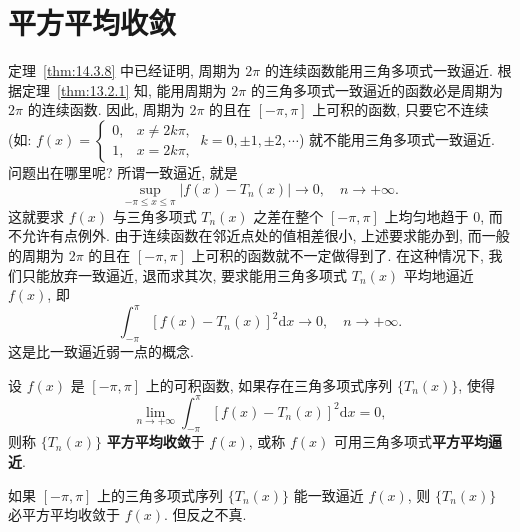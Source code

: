 \section{平方平均收敛}\label{sec:16.2}

定理~\ref{thm:14.3.8} 中已经证明, 周期为 $2\pi$ 的连续函数能用三角多项式一致逼近. 根据定理~\ref{thm:13.2.1} 知, 能用周期为 $2\pi$ 的三角多项式一致逼近的函数必是周期为 $2\pi$ 的连续函数. 因此, 周期为 $2\pi$ 的且在 $[-\pi, \pi]$ 上可积的函数, 只要它不连续(如: $f(x) = \begin{cases} 0, & x \neq 2k\pi, \\ 1, & x = 2k\pi, \end{cases}\ k = 0, \pm 1, \pm 2, \cdots$) 就不能用三角多项式一致逼近. 问题出在哪里呢? 所谓一致逼近, 就是
\[
  \sup_{-\pi\leqslant x\leqslant\pi}\left|f(x)-T_{n}(x)\right|\to0,\quad n\to+\infty.
\]
这就要求 $f(x)$ 与三角多项式 $T_{n}(x)$ 之差在整个 $[-\pi, \pi]$ 上均匀地趋于 $0$, 而不允许有点例外. 由于连续函数在邻近点处的值相差很小, 上述要求能办到, 而一般的周期为 $2\pi$ 的且在 $[-\pi, \pi]$ 上可积的函数就不一定做得到了. 在这种情况下, 我们只能放弃一致逼近, 退而求其次, 要求能用三角多项式 $T_{n}(x)$ 平均地逼近 $f(x)$, 即
\[
  \int_{-\pi}^{\pi}\left[f(x)-T_{n}(x)\right]^{2}\mathrm{d}x\to0,\quad n\to+\infty.
\]
这是比一致逼近弱一点的概念.

\begin{definition}\label{def:16.2.1}
设 $f(x)$ 是 $[-\pi, \pi]$ 上的可积函数, 如果存在三角多项式序列 $\{T_{n}(x)\}$, 使得
\[
  \lim_{n\to+\infty}\int_{-\pi}^{\pi}\left[f(x)-T_{n}(x)\right]^{2}\mathrm{d}x=0,
\]
则称 $\{T_{n}(x)\}$ \textbf{平方平均收敛}于 $f(x)$, 或称 $f(x)$ 可用三角多项式\textbf{平方平均逼近}.
\end{definition}

\begin{theorem}\label{thm:16.2.1}
如果 $[-\pi, \pi]$ 上的三角多项式序列 $\{T_{n}(x)\}$ 能一致逼近 $f(x)$, 则 $\{T_{n}(x)\}$ 必平方平均收敛于 $f(x)$. 但反之不真.
\end{theorem}

